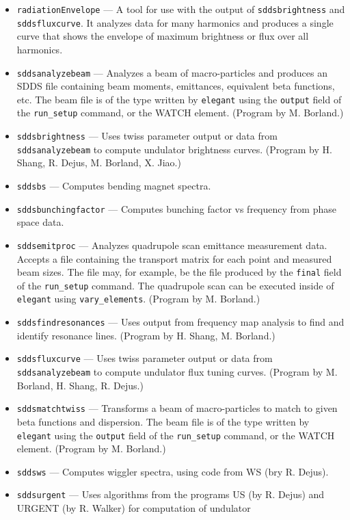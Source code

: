 \documentclass[11pt]{article}
\begin{document}
\begin{itemize}
\item {\tt radiationEnvelope} --- A tool for use with the output of {\tt sddsbrightness} and {\tt sddsfluxcurve}.
  It analyzes data for many harmonics and produces a single curve that shows the envelope of maximum
  brightness or flux over all harmonics.
\item {\tt sddsanalyzebeam} --- Analyzes a beam of macro-particles and produces an SDDS file
        containing beam moments, emittances, equivalent beta functions, etc.  The beam file
        is of the type written by {\tt elegant} using the {\tt output} field of the {\tt run\_setup}
        command, or the WATCH element.  (Program by M. Borland.)
\item {\tt sddsbrightness} --- Uses twiss parameter output or data from {\tt sddsanalyzebeam} to
  compute undulator brightness curves.  (Program by H. Shang, R. Dejus, M. Borland, X. Jiao.)
\item {\tt sddsbs} --- Computes bending magnet spectra.
\item {\tt sddsbunchingfactor} --- Computes bunching factor vs frequency from phase space data.
\item {\tt sddsemitproc} --- Analyzes quadrupole scan emittance measurement data.  Accepts a
        file containing the transport matrix for each point and measured beam sizes.  
        The file may, for example, be the file produced
        by the {\tt final} field of the {\tt run\_setup} command.  The quadrupole scan can be
        executed inside of {\tt elegant} using {\tt vary\_elements}. (Program by M. Borland.)
\item {\tt sddsfindresonances} --- Uses output from frequency map analysis to find and identify resonance lines.
 (Program by H. Shang, M. Borland.)
\item {\tt sddsfluxcurve} --- Uses twiss parameter output or data from {\tt sddsanalyzebeam} to
  compute undulator flux tuning curves.  (Program by M. Borland, H. Shang, R. Dejus.)
\item {\tt sddsmatchtwiss} --- Transforms a beam of macro-particles to match to given beta
        functions and dispersion.    The beam file
        is of the type written by {\tt elegant} using the {\tt output} field of the {\tt run\_setup}
        command, or the WATCH element. (Program by M. Borland.)
\item {\tt sddsws} --- Computes wiggler spectra, using code from WS (bry R. Dejus).
\item {\tt sddsurgent} --- Uses algorithms from the programs US (by R. Dejus) and URGENT (by R. Walker) for computation of undulator

\end{itemize}
\end{document}
